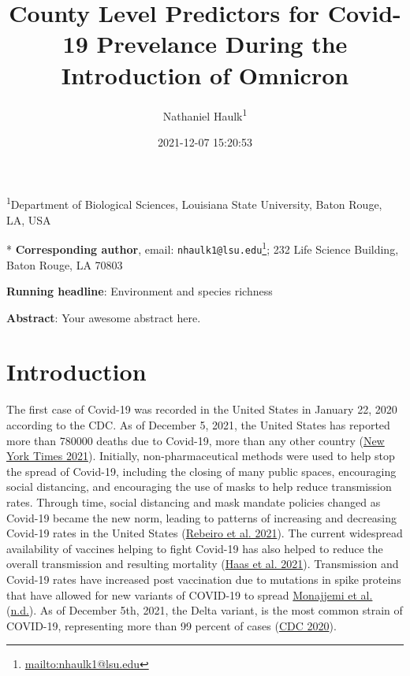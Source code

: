 \documentclass[
  12pt,
]{article}
\title{County Level Predictors for Covid-19 Prevelance During the Introduction of Omnicron}
\author{Nathaniel Haulk\textsuperscript{1}}
\date{2021-12-07 15:20:53}
\DeclareRobustCommand{\href}[2]{#2\footnote{\url{#1}}}
\begin{document}
\maketitle

\renewcommand{\figurename}{{\textbf{Figure}}}
\renewcommand{\tablename}{{\textbf{Table}}}

\footnotesize

\textsuperscript{1}Department of Biological Sciences, Louisiana State University, Baton Rouge, LA, USA

* \textbf{Corresponding author}, email: \href{mailto:nhaulk1@lsu.edu}{\nolinkurl{nhaulk1@lsu.edu}}; 232 Life Science Building, Baton Rouge, LA 70803

\normalsize

\textbf{Running headline}: Environment and species richness

\textbf{Abstract}: Your awesome abstract here.

\clearpage

\hypertarget{introduction}{%
\section{Introduction}\label{introduction}}

The first case of Covid-19 was recorded in the United States in January 22, 2020 according to the CDC. As of December 5, 2021, the United States has reported more than 780000 deaths due to Covid-19, more than any other country (\protect\hyperlink{ref-new_york_times_coronavirus_2021}{New York Times 2021}). Initially, non-pharmaceutical methods were used to help stop the spread of Covid-19, including the closing of many public spaces, encouraging social distancing, and encouraging the use of masks to help reduce transmission rates. Through time, social distancing and mask mandate policies changed as Covid-19 became the new norm, leading to patterns of increasing and decreasing Covid-19 rates in the United States (\protect\hyperlink{ref-rebeiro_impact_2021}{Rebeiro et al. 2021}). The current widespread availability of vaccines helping to fight Covid-19 has also helped to reduce the overall transmission and resulting mortality (\protect\hyperlink{ref-haas_infections_2021}{Haas et al. 2021}). Transmission and Covid-19 rates have increased post vaccination due to mutations in spike proteins that have allowed for new variants of COVID-19 to spread \protect\hyperlink{ref-monajjemi_delta_nodate}{Monajjemi et al.} (\protect\hyperlink{ref-monajjemi_delta_nodate}{n.d.}). As of December 5th, 2021, the Delta variant, is the most common strain of COVID-19, representing more than 99 percent of cases (\protect\hyperlink{ref-cdc_covid_2020}{CDC 2020}).
\end{document}
